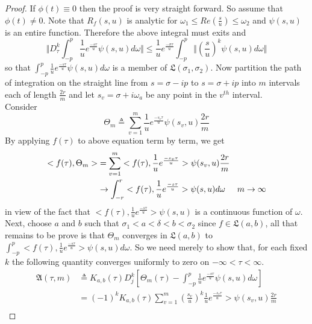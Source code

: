  \begin{proof}
 If $ \phi(t)\equiv 0 $ then the proof is very straight forward. So assume that $ \phi(t)\neq 0 $. Note that $ R_{f}(s,u)$ is analytic for $\omega_{1}\leq Re(\frac{s}{u})\leq \omega_{2}$
and $\psi(s,u)$ is an entire function. Therefore the above integral must exits and
\begin{equation}
\Vert D_{\tau}^{k}\int_{-p}^{p}\frac{1}{u}e^{\frac{-s\tau}{u}}\psi(s,u)d\omega \Vert \leq \frac{1}{u}e^{\frac{-\sigma\tau}{u}}\int_{-p}^{p} \Vert (\frac{s}{u})^{k}\psi(s,u)d\omega \Vert
\end{equation} 
 so that $ \int_{-p}^{p}\frac{1}{u}e^{\frac{-s\tau}{u}}\psi(s,u)d\omega $  is a member of $\mathfrak{L}(\sigma_{1},\sigma_{2})$. Now partition the path of integration on the straight line from $ s=\sigma-ip $ to  $ s=\sigma+ip $ into $m$ intervals each of length $\frac{2r}{m}$ and let $s_{v}=\sigma+i\omega_{a}$ be any point in the $v^{th}$ interval.\\
 Consider 
 \begin{equation}
 \Theta_{m}\triangleq \sum_{v=1}^{m}\frac{1}{u}e^{\frac{-s_{v}\tau}{u}}\psi(s_{v},u)\frac{2r}{m} 
 \end{equation}
 By applying $f(\tau)$ to above equation term by term, we get
 \begin{align}
 < f(\tau),\Theta_{m} > &= \sum_{v=1}^{m}<f(\tau),\frac{1}{u}e^{\frac{-s_{v}\tau}{u}}>\psi(s_{v},u)\frac{2r}{m}\\
& \rightarrow \int_{-r}^{r}<f(\tau),\frac{1}{u}e^{\frac{-s\tau}{u}}>\psi(s,u)d\omega \hspace{0.5cm} m\rightarrow \infty
 \end{align}
 in view of the fact that $ <f(\tau),\frac{1}{u}e^{\frac{-s\tau}{u}}>\psi(s,u) $ is a continuous function of $ \omega $.\\
 Next, choose $a$ and $b$ such that $ \sigma_{1}<a<\delta<b<\sigma_{2}$ since $ f \in \mathfrak{L}(a,b)$, all that remains to be prove is that $ \Theta_{m} $ converges in $ \mathfrak{L}(a,b) $ to $ \int_{-p}^{p}<f(\tau),\frac{1}{u}e^{\frac{-s\tau}{u}}>\psi(s,u)d\omega $. So we need merely to show that, for each fixed $k$ the following quantity converges uniformly to zero on $ -\infty<\tau<\infty $.
 \begin{align}
 \mathfrak{A}(\tau,m)&\triangleq K_{a,b}(\tau)D_{j}^{k}[\Theta_{m}(\tau)-\int_{-p}^{p}\frac{1}{u}e^{\frac{-s\tau}{u}}\psi(s,u)d\omega ]\\
& =(-1)^{k}K_{a,b}(\tau)\sum_{v=1}^{m}(\frac{s_{v}}{u})^{k}\frac{1}{u}e^{\frac{-s_{v}\tau}{u}}>\psi(s_{v},u)\frac{2r}{m}\\

\end{align}
\end{proof}
